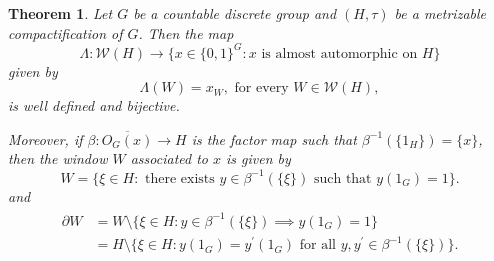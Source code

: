 \documentclass[titlepage,reqno,10pt]{amsart}
\newtheorem{theorem}{Theorem}[section]
\theoremstyle{definition}
\begin{document}
 \begin{theorem}\label{thm: almost-automorphic-model-set}
    Let $G$  be a countable discrete group and $(H,\tau)$ be a metrizable compactification of $G$. Then the map
    $$
    \Lambda: \mathcal{W}(H)\to \{x\in \{0,1\}^{G}: x \mbox{ is almost automorphic on } H\}
    $$
    given by
    $$
    \Lambda(W)=x_W, \mbox{ for every } W\in \mathcal{W}(H),
    $$
    is well defined and bijective.  
    
    Moreover, if $\beta: \overline{O_G(x)}\to H$ is the factor map such that $\beta^{-1}(\{1_H\})=\{x\}$, then the window $W$ associated to $x$ is given by
    $$
    W=\{\xi\in H: \mbox{ there exists } y\in \beta^{-1}(\{\xi\}) \mbox{ such that } y(1_G)=1\}.
    $$
    and
    \begin{align}\label{eq: chara boundary}
    \begin{split}
    \partial W&=W\setminus \{\xi\in H: y\in \beta^{-1}(\{\xi\}) \implies y(1_G)=1\}\\
    &= H \setminus \{\xi\in H: y(1_G) = y^\prime(1_G)\text{ for all } y,y^\prime \in \beta^{-1}(\{\xi\})\}.
    \end{split}
    \end{align}
\end{theorem}
\end{document}
